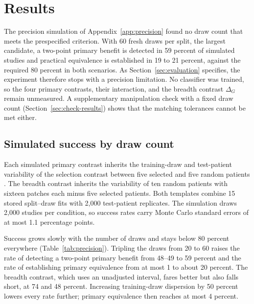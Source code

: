 \section{Results}
\label{sec:results}
The precision simulation of Appendix~\ref{app:precision} found no draw count that meets the prespecified criterion. With 60 fresh draws per split, the largest candidate, a two-point primary benefit is detected in 59 percent of simulated studies and practical equivalence is established in 19 to 21 percent, against the required 80 percent in both scenarios. As Section~\ref{sec:evaluation} specifies, the experiment therefore stops with a precision limitation. No classifier was trained, so the four primary contrasts, their interaction, and the breadth contrast $\Delta_G$ remain unmeasured. A supplementary manipulation check with a fixed draw count (Section~\ref{sec:check-results}) shows that the matching tolerances cannot be met either.

\subsection{Simulated success by draw count}
\label{sec:precision-results}
Each simulated primary contrast inherits the training-draw and test-patient variability of the selection contrast between five selected and five random patients \citep{queisler2026shortageSelection}. The breadth contrast inherits the variability of ten random patients with sixteen patches each minus five selected patients. Both templates combine 15 stored split--draw fits with 2,000 test-patient replicates. The simulation draws 2,000 studies per condition, so success rates carry Monte Carlo standard errors of at most 1.1 percentage points.

Success grows slowly with the number of draws and stays below 80 percent everywhere (Table~\ref{tab:precision}). Tripling the draws from 20 to 60 raises the rate of detecting a two-point primary benefit from 48--49 to 59 percent and the rate of establishing primary equivalence from at most 1 to about 20 percent. The breadth contrast, which uses an unadjusted interval, fares better but also falls short, at 74 and 48 percent. Increasing training-draw dispersion by 50 percent lowers every rate further; primary equivalence then reaches at most 4 percent.

